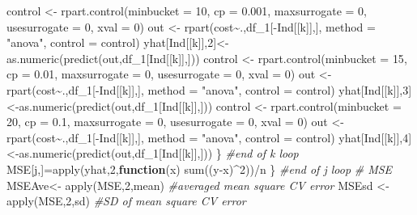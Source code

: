 \documentclass[
]{article}
\newenvironment{Shaded}{\begin{snugshade}}{\end{snugshade}}
\newcommand{\AttributeTok}[1]{\textcolor[rgb]{0.77,0.63,0.00}{#1}}
\newcommand{\CommentTok}[1]{\textcolor[rgb]{0.56,0.35,0.01}{\textit{#1}}}
\newcommand{\ControlFlowTok}[1]{\textcolor[rgb]{0.13,0.29,0.53}{\textbf{#1}}}
\newcommand{\DecValTok}[1]{\textcolor[rgb]{0.00,0.00,0.81}{#1}}
\newcommand{\FloatTok}[1]{\textcolor[rgb]{0.00,0.00,0.81}{#1}}
\newcommand{\FunctionTok}[1]{\textcolor[rgb]{0.00,0.00,0.00}{#1}}
\newcommand{\NormalTok}[1]{#1}
\newcommand{\OtherTok}[1]{\textcolor[rgb]{0.56,0.35,0.01}{#1}}
\newcommand{\SpecialCharTok}[1]{\textcolor[rgb]{0.00,0.00,0.00}{#1}}
\newcommand{\StringTok}[1]{\textcolor[rgb]{0.31,0.60,0.02}{#1}}
\begin{document}
\begin{Shaded}
\begin{Highlighting}[]
\NormalTok{    control }\OtherTok{\textless{}{-}} \FunctionTok{rpart.control}\NormalTok{(}\AttributeTok{minbucket =} \DecValTok{10}\NormalTok{, }\AttributeTok{cp =} \FloatTok{0.001}\NormalTok{, }\AttributeTok{maxsurrogate =} \DecValTok{0}\NormalTok{, }\AttributeTok{usesurrogate =} \DecValTok{0}\NormalTok{, }\AttributeTok{xval =} \DecValTok{0}\NormalTok{)}
\NormalTok{    out }\OtherTok{\textless{}{-}} \FunctionTok{rpart}\NormalTok{(cost}\SpecialCharTok{\textasciitilde{}}\NormalTok{.,df\_1[}\SpecialCharTok{{-}}\NormalTok{Ind[[k]],], }\AttributeTok{method =} \StringTok{"anova"}\NormalTok{, }\AttributeTok{control =}\NormalTok{ control)}
\NormalTok{    yhat[Ind[[k]],}\DecValTok{2}\NormalTok{]}\OtherTok{\textless{}{-}}\FunctionTok{as.numeric}\NormalTok{(}\FunctionTok{predict}\NormalTok{(out,df\_1[Ind[[k]],]))}
\NormalTok{    control }\OtherTok{\textless{}{-}} \FunctionTok{rpart.control}\NormalTok{(}\AttributeTok{minbucket =} \DecValTok{15}\NormalTok{, }\AttributeTok{cp =} \FloatTok{0.01}\NormalTok{, }\AttributeTok{maxsurrogate =} \DecValTok{0}\NormalTok{, }\AttributeTok{usesurrogate =} \DecValTok{0}\NormalTok{, }\AttributeTok{xval =} \DecValTok{0}\NormalTok{)}
\NormalTok{    out }\OtherTok{\textless{}{-}} \FunctionTok{rpart}\NormalTok{(cost}\SpecialCharTok{\textasciitilde{}}\NormalTok{.,df\_1[}\SpecialCharTok{{-}}\NormalTok{Ind[[k]],], }\AttributeTok{method =} \StringTok{"anova"}\NormalTok{, }\AttributeTok{control =}\NormalTok{ control)}
\NormalTok{    yhat[Ind[[k]],}\DecValTok{3}\NormalTok{]}\OtherTok{\textless{}{-}}\FunctionTok{as.numeric}\NormalTok{(}\FunctionTok{predict}\NormalTok{(out,df\_1[Ind[[k]],]))}
\NormalTok{    control }\OtherTok{\textless{}{-}} \FunctionTok{rpart.control}\NormalTok{(}\AttributeTok{minbucket =} \DecValTok{20}\NormalTok{, }\AttributeTok{cp =} \FloatTok{0.1}\NormalTok{, }\AttributeTok{maxsurrogate =} \DecValTok{0}\NormalTok{, }\AttributeTok{usesurrogate =} \DecValTok{0}\NormalTok{, }\AttributeTok{xval =} \DecValTok{0}\NormalTok{)}
\NormalTok{    out }\OtherTok{\textless{}{-}} \FunctionTok{rpart}\NormalTok{(cost}\SpecialCharTok{\textasciitilde{}}\NormalTok{.,df\_1[}\SpecialCharTok{{-}}\NormalTok{Ind[[k]],], }\AttributeTok{method =} \StringTok{"anova"}\NormalTok{, }\AttributeTok{control =}\NormalTok{ control)}
\NormalTok{    yhat[Ind[[k]],}\DecValTok{4}\NormalTok{]}\OtherTok{\textless{}{-}}\FunctionTok{as.numeric}\NormalTok{(}\FunctionTok{predict}\NormalTok{(out,df\_1[Ind[[k]],]))}
\NormalTok{  \} }\CommentTok{\#end of k loop}
\NormalTok{  MSE[j,]}\OtherTok{=}\FunctionTok{apply}\NormalTok{(yhat,}\DecValTok{2}\NormalTok{,}\ControlFlowTok{function}\NormalTok{(x) }\FunctionTok{sum}\NormalTok{((y}\SpecialCharTok{{-}}\NormalTok{x)}\SpecialCharTok{\^{}}\DecValTok{2}\NormalTok{))}\SpecialCharTok{/}\NormalTok{n}
\NormalTok{\} }\CommentTok{\#end of j loop}
\CommentTok{\# MSE}
\NormalTok{MSEAve}\OtherTok{\textless{}{-}} \FunctionTok{apply}\NormalTok{(MSE,}\DecValTok{2}\NormalTok{,mean) }\CommentTok{\#averaged mean square CV error}
\NormalTok{MSEsd }\OtherTok{\textless{}{-}} \FunctionTok{apply}\NormalTok{(MSE,}\DecValTok{2}\NormalTok{,sd)  }\CommentTok{\#SD of mean square CV error}


\end{Highlighting}
\end{Shaded}
\end{document}
